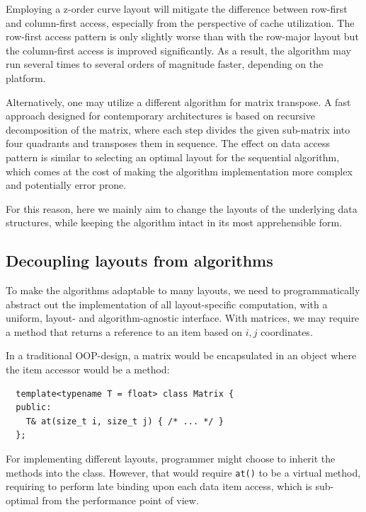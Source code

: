 Employing a z-order curve layout will mitigate the difference between row-first and column-first access, especially from the perspective of cache utilization. The row-first access pattern is only slightly worse than with the row-major layout but the column-first access is improved significantly. As a result, the algorithm may run several times to several orders of magnitude faster, depending on the platform.

Alternatively, one may utilize a different algorithm for matrix transpose. A fast approach designed for contemporary architectures is based on recursive decomposition of the matrix, where each step divides the given sub-matrix into four quadrants and transposes them in sequence. The effect on data access pattern is similar to selecting an optimal layout for the sequential algorithm, which comes at the cost of making the algorithm implementation more complex and potentially error prone.

For this reason, here we mainly aim to change the layouts of the underlying data structures, while keeping the algorithm intact in its most apprehensible form.


\subsection{Decoupling layouts from algorithms}

To make the algorithms adaptable to many layouts, we need to programmatically abstract out the implementation of all layout-specific computation, with a uniform, layout- and algorithm-agnostic interface. With matrices, we may require a method that returns a reference to an item based on $i,j$ coordinates.

In a traditional OOP-design, a matrix would be encapsulated in an object where the item accessor would be a method:
\begin{verbatim}
  template<typename T = float> class Matrix {
  public:
    T& at(size_t i, size_t j) { /* ... */ }
  };
\end{verbatim}

For implementing different layouts, programmer might choose to inherit the methods into the class. However, that would require \texttt{at()} to be a virtual method, requiring to perform late binding upon each data item access, which is sub-optimal from the performance point of view.

